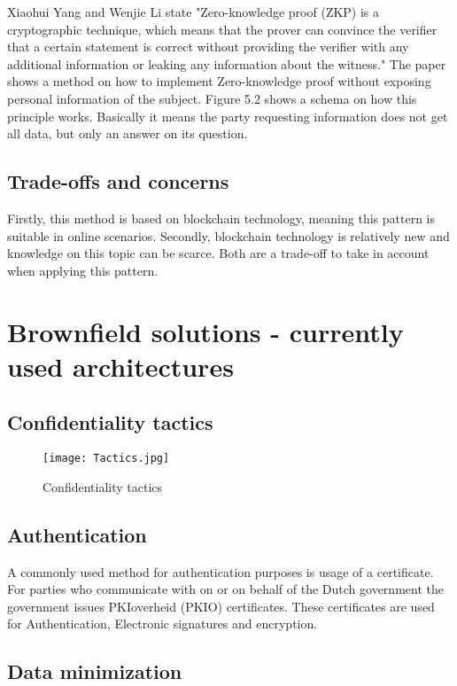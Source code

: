 Xiaohui Yang and Wenjie Li\cite{YANG2020102050} state "Zero-knowledge proof (ZKP) is a cryptographic technique,
which means that the prover can convince the verifier that a certain statement is correct without providing the verifier with any additional information or leaking any information about the witness." The paper shows a method on how to implement Zero-knowledge proof without exposing personal information of the subject. Figure 5.2 shows a schema on how this principle works. Basically it means the party requesting information does not get all data, but only an answer on its question.

\subsection{Trade-offs and concerns}
Firstly, this method is based on blockchain technology, meaning this pattern is suitable in online scenarios. Secondly, blockchain technology is relatively new and knowledge on this topic can be scarce. Both are a trade-off to take in account when applying this pattern. 

\section{Brownfield solutions - currently used architectures }
\subsection{Confidentiality tactics}
\graphicspath{ {./images/} }
\begin{figure}[t]
\centering
\label{fig:Tactics}
\texttt{[image: Tactics.jpg]}\\
\caption{Confidentiality tactics}
\end{figure}

\subsection{Authentication}
A commonly used method for authentication purposes is usage of a certificate. For parties who communicate with on or on behalf of the Dutch government the government issues PKIoverheid (PKIO) certificates. These certificates are used for Authentication, Electronic signatures and encryption. \cite{Logius_PKIO}

\subsection{Data minimization}
\lipsum[1-1]

